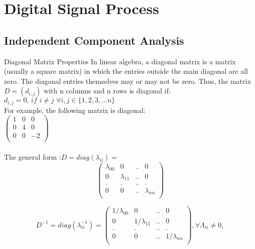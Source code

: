 \chapter{Digital Signal Process} %

\label{Chapter2} %


\section{Independent Component Analysis}
\begin{compactitem}

\item Diagonal Matrix Properties
In linear algebra, a diagonal matrix is a matrix (usually a square matrix) in which
the entries outside the main diagonal are all zero. The diagonal entries themselves
may or may not be zero. Thus, the matrix $D = (d_{i,j})$ with n columns and n rows is diagonal
if:
$d_{i,j}=0,\, if \,\, i \neq j \,\, \forall i,j \in \{1,2,3,...n\} $
\\For example, the following matrix is diagonal:\\
$\begin{pmatrix}
       1	&0 	&0	\\[0.3em]
       0 	&4 	&0 	\\[0.3em]
       0 	& 0 	&-2	\\[0.3em]
\end{pmatrix}
$ \cite{wiki-Diagonal_matrix}
\\
\\The general form :$D=diag(\lambda_{ii}) =$
\begin{equation}
\label{eq:diagm}
\begin{pmatrix}
       \lambda_{00}& 0 				& ..	&	0 	\\[0.3em]
       0 			& \lambda_{11} & ..		&	0 	\\[0.3em]
       .			& .				& ..	&	.	\\[0.3em]
       0 			& 0 			& ..	&	\lambda_{nn}\\[0.3em]
     \end{pmatrix}
\end{equation}

\begin{equation}
\label{eq:pdpD}
D^{-1}=diag(\lambda_{ii}^{-1})=
\begin{pmatrix}
       1/\lambda_{00}& 0 				& ..	&	0 	\\[0.3em]
       0 			& 1/\lambda_{11} & ..		&	0 	\\[0.3em]
       .			& .				& ..	&	.	\\[0.3em]
       0 			& 0 			& ..	&	1/\lambda_{nn}\\[0.3em]
\end{pmatrix}
, \forall \Lambda_{ii} \neq 0,
\end{equation}\\


\end{compactitem}
